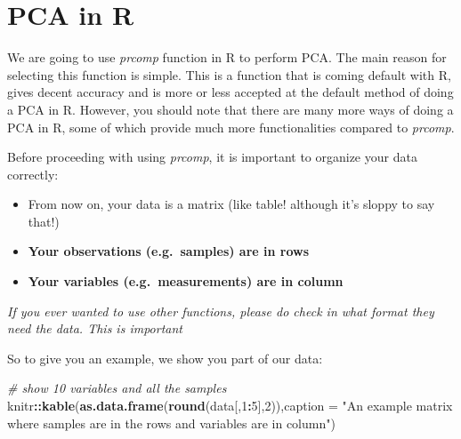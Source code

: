 \documentclass[
]{book}
\newenvironment{Shaded}{\begin{snugshade}}{\end{snugshade}}
\newcommand{\CommentTok}[1]{\textcolor[rgb]{0.56,0.35,0.01}{\textit{#1}}}
\newcommand{\DataTypeTok}[1]{\textcolor[rgb]{0.13,0.29,0.53}{#1}}
\newcommand{\DecValTok}[1]{\textcolor[rgb]{0.00,0.00,0.81}{#1}}
\newcommand{\KeywordTok}[1]{\textcolor[rgb]{0.13,0.29,0.53}{\textbf{#1}}}
\newcommand{\NormalTok}[1]{#1}
\newcommand{\OperatorTok}[1]{\textcolor[rgb]{0.81,0.36,0.00}{\textbf{#1}}}
\newcommand{\StringTok}[1]{\textcolor[rgb]{0.31,0.60,0.02}{#1}}
\providecommand{\tightlist}{%
  \setlength{\itemsep}{0pt}\setlength{\parskip}{0pt}}
\theoremstyle{definition}
\theoremstyle{definition}
\theoremstyle{definition}
\theoremstyle{remark}
\begin{document}
\hypertarget{pcar}{%
\section{PCA in R}\label{pcar}}

We are going to use \emph{prcomp} function in R to perform PCA. The main reason for selecting this function is simple. This is a function that is coming default with R, gives decent accuracy and is more or less accepted at the default method of doing a PCA in R. However, you should note that there are many more ways of doing a PCA in R, some of which provide much more functionalities compared to \emph{prcomp}.

Before proceeding with using \emph{prcomp}, it is important to organize your data correctly:

\begin{itemize}
\tightlist
\item
  From now on, your data is a matrix (like table! although it's sloppy to say that!)
\item
  \textbf{Your observations (e.g.~samples) are in rows}
\item
  \textbf{Your variables (e.g.~measurements) are in column}
\end{itemize}

\emph{If you ever wanted to use other functions, please do check in what format they need the data. This is important}

So to give you an example, we show you part of our data:

\begin{Shaded}
\begin{Highlighting}[]
\CommentTok{# show 10 variables and all the samples}
\NormalTok{knitr}\OperatorTok{::}\KeywordTok{kable}\NormalTok{(}\KeywordTok{as.data.frame}\NormalTok{(}\KeywordTok{round}\NormalTok{(data[,}\DecValTok{1}\OperatorTok{:}\DecValTok{5}\NormalTok{],}\DecValTok{2}\NormalTok{)),}\DataTypeTok{caption =} \StringTok{"An example matrix where samples are in the rows and variables are in column"}\NormalTok{)}
\end{Highlighting}
\end{Shaded}
\end{document}
